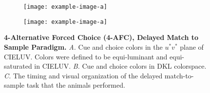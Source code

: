 \begin{figure}
    \centering
    \begin{subfigure}[b]{0.3\textwidth}
         \centering
         \caption{}
         
         \label{fig:StimuliChromaticities}
    \end{subfigure}
    \hfill
    \begin{subfigure}[b]{0.65\textwidth}
         \centering
         \caption{}
         
         \label{fig:epochs}
    \end{subfigure}

    \begin{subfigure}[b]{0.49\textwidth}
         \centering
         \caption{}
         
         \label{fig:Bias1}
    \end{subfigure}
        \hfill
    \begin{subfigure}[b]{0.49\textwidth}
         \centering
         \caption{}
         
         \label{fig:Bias2}
    \end{subfigure}
    \begin{subfigure}[b]{0.49\textwidth}
         \centering
         \caption{}
         \texttt{[image: example-image-a]}
         \label{fig:BiasLinear}
    \end{subfigure}
    \begin{subfigure}[b]{0.49\textwidth}
         \centering
         \caption{}
         \texttt{[image: example-image-a]}
         \label{fig:BiasPredictions}
    \end{subfigure}
    
    \caption{\textbf{4-Alternative Forced Choice (4-AFC), Delayed Match to Sample Paradigm.}
    \emph{A.} Cue and choice colors in the $u^*v^*$ plane of CIELUV. Colors were defined to be equi-luminant and equi-saturated in CIELUV.
    \emph{B.} Cue and choice colors in DKL colorspace.
    \emph{C.} The timing and visual organization of the delayed match-to-sample task that the animals performed.
} 
    \label{fig:ParadigmAnalysisPredictions}
    
\end{figure}

